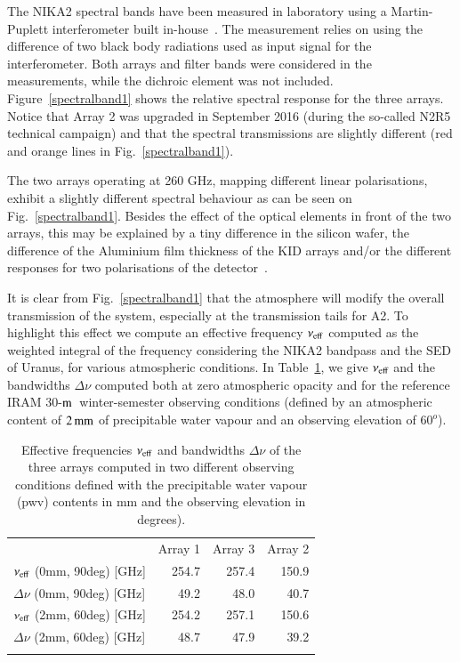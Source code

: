 \documentclass[traditionalabstract]{aa}
\newcommand{\trentemetre}{30-$\rm{m}$}
\newcommand{\lp}[1]{#1}
\begin{document}
The NIKA2 spectral bands have been measured in laboratory using a
Martin-Puplett interferometer built in-house~\citep{Durand2007_these}.
The measurement relies on using the difference of two black
body radiations used as input signal for the interferometer. 
{\lp Both arrays and filter bands were considered in the
measurements, while the dichroic element was not included.}
Figure~\ref{spectralband1} shows the relative spectral response for
the three arrays. Notice that Array 2 was
upgraded in September 2016 (during the so-called N2R5 technical campaign) and that
the spectral transmissions are slightly different (red and orange lines in
Fig.~\ref{spectralband1}).

The two arrays operating at 260 GHz, mapping different linear polarisations,
exhibit a slightly different spectral behaviour as can be
seen on Fig.~\ref{spectralband1}. {\lp Besides the effect of the
optical elements in front of the two arrays, this may be explained by
a tiny difference in the silicon wafer, the difference of the
Aluminium film thickness of the KID arrays and/or the different
responses for two polarisations of the
detector~\citep{Adam2018, Shu2018_bandpass}.}

It is clear from Fig.~\ref{spectralband1} that the atmosphere will
modify the overall transmission of the system, especially at the
transmission tails for A2. {\lp To highlight this effect we compute an effective
frequency $\nu_{\rm{eff}}$ computed as the weighted integral of the
frequency considering the NIKA2 bandpass and the SED of Uranus, for
various atmospheric conditions.}
In Table~\ref{tab:frequencies}, we give $\nu_{\rm{eff}}$ and the
bandwidths $\Delta \nu$ computed both at zero atmospheric opacity and for the
reference IRAM \trentemetre\ winter-semester observing conditions
(defined by an atmospheric content of $2\,\rm{mm}$ of precipitable
water vapour and an observing elevation of $60^o$).

\begin{table}[!htbp]
  \caption[]{Effective frequencies $\nu_{\rm{eff}}$ and bandwidths
    $\Delta \nu$
    of the three arrays computed in two different observing conditions
    defined with the precipitable water vapour (pwv) contents in mm and
    the observing elevation in degrees).}
  \label{tab:frequencies}
  \centering    
  \begin{tabular}{lrrr}
    \hline\hline
    \noalign{\smallskip}
    & Array 1 & Array 3 & Array 2 \\
    \noalign{\smallskip}
    \hline
    \noalign{\smallskip}
    $\nu_{\rm{eff}}$ \small{(0mm, 90deg)} [GHz] & 254.7 & 257.4 &  150.9 \\
    $\Delta \nu$ \small{(0mm, 90deg)} [GHz] &  49.2 & 48.0  &   40.7 \\
    $\nu_{\rm{eff}}$ \small{(2mm, 60deg)} [GHz] & 254.2 & 257.1 &  150.6 \\
    $\Delta \nu$ \small{(2mm, 60deg)} [GHz] &  48.7 &  47.9 &    39.2 \\
    \noalign{\smallskip}
    \hline
  \end{tabular}
\end{table}
\end{document}
